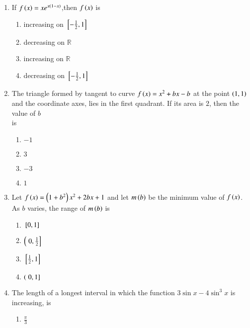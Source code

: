 \documentclass[journal]{IEEEtran}
\begin{document}
\begin{enumerate}[start=9]
\begin{multicols}{4}
\begin{enumerate}
\end{enumerate}
\end{multicols}
\item If $f\left(x\right)=xe^{x\left(1-x\right)}$,then $f\left(x\right)$ is 
\hfill {}
\begin{multicols}{2}
\begin{enumerate}
    \item increasing on ${}\left[-\frac{1}{2},1\right]$
    \item decreasing on $\mathbb{R}$
    \item increasing on $\mathbb{R}$
    \item decreasing on ${}\left[-\frac{1}{2},1\right]$
\end{enumerate}
\end{multicols}

\item The triangle formed by tangent to curve $f\left(x\right)=x^2+bx-b$ at the point $\left(1,1\right)$ and the coordinate axes, lies in the first quadrant. If its area is $2$, then the value of $b$ \\is 
\hfill {}
\begin{multicols}{4}
\begin{enumerate}
    \item$-1$
    \item$3$
    \item$-3$
    \item$1$
\end{enumerate}
\end{multicols}
\item Let $f\left(x\right)=\left(1+b^2\right)x^2+2bx+1$ and let $m\left(b\right)$ be the minimum value of $f\left(x\right)$. As $b$ varies, the range of $m\left(b\right)$ is 
\hfill {}
\begin{multicols}{4}
\begin{enumerate}
    \item ${}\left[0,1\right]$
    \item $\left({}\left.0,\frac{1}{2}\right]\right.$
    \item ${}\left[\frac{1}{2},1\right]$
    \item $\left({}\left.0,1\right]\right.$
\end{enumerate}
\end{multicols}
\item The length of a longest interval in which the function $3 \sin x-4\sin^3x$ is increasing, is \hfill {}
\begin{multicols}{4}
\begin{enumerate}
    \item $\frac{\pi}{3}$

\end{enumerate}
\end{multicols}
\end{enumerate}
\end{document}
